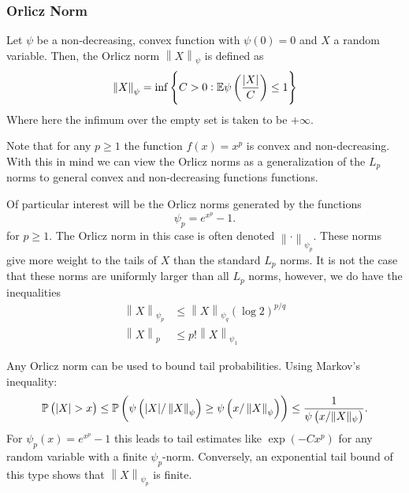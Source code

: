 \subsubsection{Orlicz Norm}

\begin{definition}
	\label{def:orlicz}
	Let \(\psi\) be a non-decreasing, convex function with  \(\psi(0)=0\) and  \(X\) a random variable. Then, the Orlicz norm  \(\left\|X\right\|_\psi\) is defined as 
	\begin{equation}
		\label{eq:orlicz}
		\left\|X\right\|_\psi = \inf\left\{C > 0 : \mathbb{E}\psi\left(\frac{|X|}{C} \right)\leq 1\right\}
	\end{equation}
	Where here the infimum over the empty set is taken to be \(+\infty\).
\end{definition}
\begin{remark*}
	Note that for any \(p\geq 1\) the function \(f(x) = x^p\) is convex and non-decreasing. With this in mind we can view the Orlicz norms as a generalization of the \(L_p\) norms to general convex and non-decreasing functions functions.
\end{remark*}

\begin{remark*}
	Of particular interest will be the Orlicz norms generated by the functions
	\[
		\psi_p = e^{x^p}-1
	.\] 
	for \(p\geq 1\). The Orlicz norm in this case is often denoted \(\left\|\cdot\right\|_{\psi_p}\).  These norms give more weight to the tails of \(X\) than the standard  \(L_p\) norms. It is not the case that these norms are uniformly larger than all \(L_p\) norms, however, we do have the inequalities
	\begin{align*}
		\left\|X\right\|_{\psi_p} &\leq \left\|X\right\|_{\psi_q}\left(\log 2\right)^{p/q}\\ 
		\left\|X\right\|_p &\leq p!\left\|X\right\|_{\psi_1}
	\end{align*}
\end{remark*}

\begin{remark*}
    \label{rem:orlicz}
	Any Orlicz norm can be used to bound tail probabilities. Using Markov's inequality:
	\[
		\P\left(\left|X\right|>x\right)\leq \P\left(\psi\left(|X|/\left\|X\right\|_\psi\right)\geq \psi\left(x/\left\|X\right\|_\psi\right)\right) \leq \frac{1}{\psi\left(x/\|X\|_\psi\right)} 
	.\] 
	For \(\psi_p(x) = e^{x^p}-1\) this leads to tail estimates like  \(\exp\left(-Cx^p\right)\) for any random variable with a finite \(\psi_p\)-norm. Conversely, an exponential tail bound of this type shows that  \(\left\|X\right\|_{\psi_p}\) is finite.
\end{remark*}

